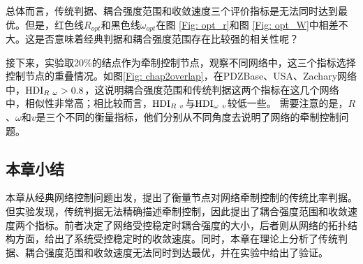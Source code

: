 总体而言，传统判据、耦合强度范围和收敛速度三个评价指标是无法同时达到最优。但是，红色线$ R_{opt} $和黑色线$ \omega_{opt} $在图 \ref{Fig: opt_r}和图 \ref{Fig: opt_W}中相差不大。这是否意味着经典判据和耦合强度范围存在比较强的相关性呢？

接下来，实验取20\%的结点作为牵制控制节点，观察不同网络中，这三个指标选择控制节点的重叠情况。如图\ref{Fig: chap2overlap}，在PDZBase、USA、Zachary网络中，$ {\rm HDI}_{R~\omega}>0.8 $，这说明耦合强度范围和传统判据这两个指标在这几个网络中，相似性非常高；相比较而言，$ {\rm HDI}_{R~v} $与$ {\rm HDI}_{\omega~v} $较低一些。
需要注意的是，$ R $、$ \omega $和$ v $是三个不同的衡量指标，他们分别从不同角度去说明了网络的牵制控制问题。



\subsection{本章小结}
本章从经典网络控制问题出发，提出了衡量节点对网络牵制控制的传统比率判据。但实验发现，传统判据无法精确描述牵制控制，因此提出了耦合强度范围和收敛速度两个指标。前者决定了网络受控稳定时耦合强度的大小，后者则从网络的拓扑结构方面，给出了系统受控稳定时的收敛速度。同时，本章在理论上分析了传统判据、耦合强度范围和收敛速度无法同时到达最优，并在实验中给出了验证。


\clearpage
